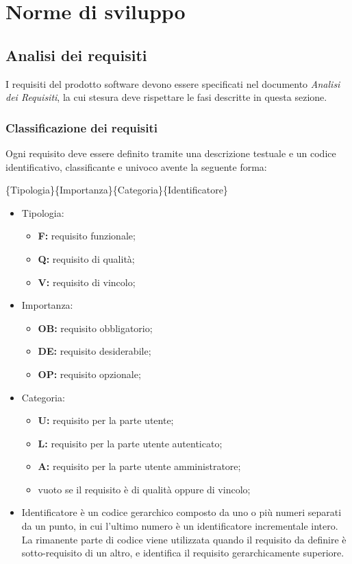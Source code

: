 \section{Norme di sviluppo}
\subsection{Analisi dei requisiti}
I requisiti del prodotto software devono essere specificati nel documento \emph{Analisi dei Requisiti}, la cui stesura deve rispettare le fasi descritte in questa sezione.

\subsubsection{Classificazione dei requisiti}
Ogni requisito deve essere definito tramite  una descrizione testuale e un codice identificativo, classificante e univoco avente la seguente forma:

\begin{center}\{Tipologia\}\{Importanza\}\{Categoria\}\{Identificatore\}\end{center}


\begin{itemize}

\item Tipologia:
\begin{itemize}
\item \textbf{F:} requisito funzionale;
\item \textbf{Q:} requisito di qualità;
\item \textbf{V:} requisito di vincolo;
\end{itemize}

\item Importanza:
\begin{itemize}
\item \textbf{OB:} requisito obbligatorio;
\item \textbf{DE:} requisito desiderabile;
\item \textbf{OP:} requisito opzionale;
\end{itemize}


\item Categoria:
\begin{itemize}
\item \textbf{U:} requisito per la parte utente;
\item \textbf{L:} requisito per la parte utente autenticato;
\item \textbf{A:} requisito per la parte utente amministratore;
\item vuoto se il requisito è di qualità oppure di vincolo;
\end{itemize}

\item Identificatore è un codice gerarchico composto da uno o più numeri separati da un punto, in cui l'ultimo numero è un identificatore incrementale intero.\\
La rimanente parte di codice viene utilizzata quando il requisito da definire è sotto-requisito di un altro, e identifica il requisito gerarchicamente superiore.

\end{itemize}

